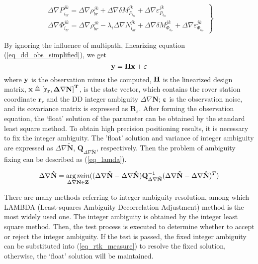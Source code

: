 \documentclass{svjour3}                     %
\begin{document}
\begin{figure*}
	\begin{equation}
	\left. \begin{array}{l}
	\Delta \nabla P_{{i_{br}}}^{jk} = \Delta \nabla \rho _{br}^{jk} + \Delta \nabla \delta M_{{P_{{i_{br}}}}}^{jk} + \Delta \nabla \varepsilon _{{P_{{i_{br}}}}}^{jk}\\
	\Delta \nabla \Phi _{{i_{br}}}^{jk} = \Delta \nabla \rho _{br}^{jk} - {\lambda _i}\Delta \nabla N_{{i_{br}}}^{jk} + \Delta \nabla \delta M_{{\Phi _{{i_{br}}}}}^{jk} + \Delta \nabla \varepsilon _{{\Phi _{{i_{br}}}}}^{jk}\end{array} \right\}
	\label{eq_dd_obs_simplified}
	\end{equation}
	
\end{figure*}
By ignoring the influence of multipath, linearizing equation (\ref{eq_dd_obs_simplified}), we get
\begin{equation}
\label{eq_rtk_measure}
{\bf{y}} = {\bf{Hx}} + {\bf{\varepsilon }}
\end{equation}
where $\bf{y}$ is the observation minus the computed,  $\bf{H} $ is the linearized design matrix\citep{hofmann-wellenhof2007gnss}, $\bf{x}\triangleq {{[{{\mathbf{r}}_{r}},\Delta \nabla \mathbf{N}]}^{T}}$, is the state vector, which contains the rover station coordinate ${{\mathbf{r}}_{r}}$ and the DD integer ambiguity $\Delta \nabla \mathbf{N}$;  $\mathbf{\varepsilon } $ is the observation noise, and its covariance matrix is expressed as  ${{\mathbf{R}}_{\varepsilon }} $. After forming the observation equation, the ‘float’ solution of the parameter can be obtained by the standard least square method. To obtain high precision positioning results, it is necessary to fix the integer ambiguity. The 'float' solution and variance of integer ambiguity are expressed as  $\Delta \nabla \mathbf{\tilde{N}} $,  ${{\mathbf{Q}}_{\Delta \nabla \mathbf{\tilde{N}}}} $, respectively. Then the problem of ambiguity fixing can be described as (\ref{eq_lamda})\citep{teunissen1995the}.
\begin{figure*}
	\begin{equation}
	\Delta \nabla {\bf{\hat N}} = \mathop {\arg min}\limits_{\Delta \nabla {\bf{N}} \in {\bf{Z}}} ((\Delta \nabla {\bf{\tilde N}} - \Delta \nabla {\bf{\hat N}}){\bf{Q}}_{\Delta \nabla {\bf{\tilde N}}}^{ - 1}{(\Delta \nabla {\bf{\tilde N}} - \Delta \nabla {\bf{\hat N}})^T})
	\label{eq_lamda}
	\end{equation}
\end{figure*}
There are many methods referring to integer ambiguity resolution, among which LAMBDA (Least-squares Ambiguity Decorrelation Adjustment)\citep{teunissen1995the} method is the most widely used one. The integer ambiguity is obtained by the integer least square method. Then, the test process is executed to determine whether to accept or reject the integer ambiguity\citep{wang2014ambiguity,wang2018improving}. If the test is passed, the fixed integer ambiguity can be substituted into (\ref{eq_rtk_measure}) to resolve the fixed solution, otherwise, the ‘float’ solution will be maintained.
\end{document}
